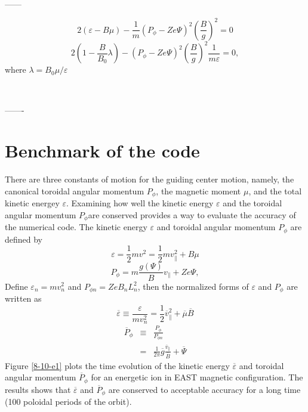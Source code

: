 \documentclass{article}
\begin{document}
\

\

\

------


\[ 2 (\varepsilon - B \mu) - \frac{1}{m} (P_{\phi} - Z e \Psi)^2 \left(
   \frac{B}{g} \right)^2 = 0 \]
\[ 2 \left( 1 - \frac{B}{B_0} \lambda \right) - (P_{\phi} - Z e \Psi)^2 \left(
   \frac{B}{g} \right)^2 \frac{1}{m \varepsilon} = 0, \]
where $\lambda = B_0 \mu / \varepsilon$

\

-------

\section{Benchmark of the code}

There are three constants of motion for the guiding center motion, namely, the
canonical toroidal angular momentum $P_{\phi}$, the magnetic moment $\mu$, and
the total kinetic energey $\varepsilon$. Examining how well the kinetic energy
$\varepsilon$ and the toroidal angular momentum $P_{\phi} $are conserved
provides a way to evaluate the accuracy of the numerical code. The kinetic
energy $\varepsilon$ and toroidal angular momentum $P_{\phi}$ are defined by
\begin{equation}
  \varepsilon = \frac{1}{2} m v^2 = \frac{1}{2} m v_{\parallel}^2 + B \mu
\end{equation}
\begin{equation}
  \label{9-28-1} P_{\phi} = m \frac{g (\Psi) }{B} v_{\parallel} + Z e \Psi,
\end{equation}
Define $\varepsilon_n = m v_n^2$ and $P_{\phi n} = Z e B_n L^2_n$, then the
normalized forms of $\varepsilon$ and $P_{\phi}$ are written as
\begin{equation}
  \overline{\varepsilon} \equiv \frac{\varepsilon}{m v_n^2} = \frac{1}{2}
  \overline{v}_{\parallel}^2 + \overline{\mu} \overline{B}
\end{equation}
\begin{eqnarray}
  \overline{P}_{\phi} & \equiv & \frac{P_{\phi}}{P_{\phi n}} \nonumber\\
  & = & \frac{1}{2 \pi}  \overline{g}  \frac{\overline{v}_{\parallel}
  }{\overline{B}} + \overline{\Psi} 
\end{eqnarray}
Figure \ref{8-10-e1} plots the time evolution of the kinetic energy
$\overline{\varepsilon}$ and toroidal angular momentum $\overline{P}_{\phi}$
for an energetic ion in EAST magnetic configuration. The results shows that
$\overline{\varepsilon}$ and $\overline{P}_{\phi}$ are conserved to acceptable
accuracy for a long time (100 poloidal periods of the orbit).
\end{document}
